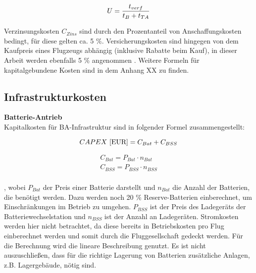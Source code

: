\begin{equation}
   U = \frac{t_{verf}}{t_B + t_{TA}} \\
   \label{utilisation}
\end{equation}

Verzinsungskosten $C_{Zins}$ sind durch den Prozentanteil von Anschaffungskosten bedingt, für diese gelten ca. 5 \%. 
Versicherungskosten sind hingegen von dem Kaufpreis eines Flugzeugs abhängig (inklusive Rabatte beim Kauf), 
in dieser Arbeit werden ebenfalls 5 \% angenommen \cite{scholz_design_evaluation_doc}. 
Weitere Formeln für kapitalgebundene Kosten sind in dem Anhang XX zu finden. %
%
\subsection{Infrastrukturkosten}

\textbf{Batterie-Antrieb}\\
Kapitalkosten für BA-Infrastruktur sind in folgender Formel zusammengestellt:

\begin{equation}
     {CAPEX ~[\text{EUR}]} = C_{Bat} + C_{BSS} \\ %
     \label{BA_Infrastruktur}
  \end{equation}

\begin{equation}
   \begin{split}
  {C_{Bat}} = P_{Bat} \cdot n_{Bat}  \\
  {C_{BSS}} = P_{BSS} \cdot n_{BSS} \\
  \label{BA}
   \end{split}
  \end{equation}

, wobei $P_{Bat}$ der Preis einer Batterie darstellt und $n_{Bat}$ die Anzahl der Batterien, die benötigt werden. 
Dazu werden noch 20 \% Reserve-Batterien einberechnet, um Einschränkungen im Betrieb zu umgehen. 
$P_{BSS}$ ist der Preis des Ladegeräts der Batteriewechselstation und $n_{BSS}$ ist der Anzahl an Ladegeräten. 
Stromkosten werden hier nicht betrachtet, da diese bereits in Betriebskosten 
pro Flug einberechnet werden und somit durch die Fluggesellschaft gedeckt werden. 
Für die Berechnung wird die lineare Beschreibung genutzt. 
Es ist nicht auszuschließen, dass für die richtige Lagerung 
von Batterien zusätzliche Anlagen, z.B. Lagergebäude, nötig sind.
  
